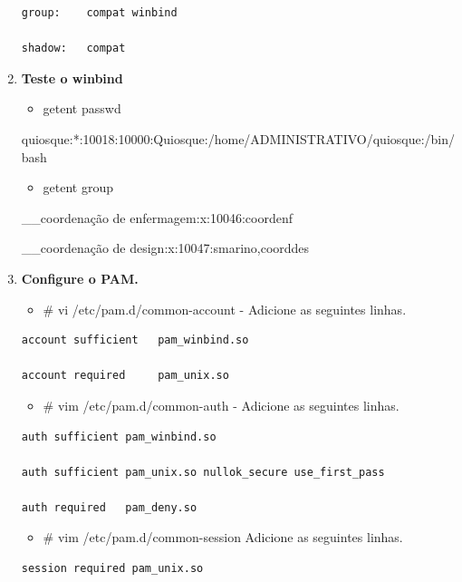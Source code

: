 \begin{enumerate}
\begin{lstlisting}
group:    compat winbind

shadow:   compat
		\end{lstlisting}

 	\item \textbf{Teste o winbind}
		\begin{itemize}
			\item {getent passwd}
		\end{itemize}
		quiosque:*:10018:10000:Quiosque:/home/ADMINISTRATIVO/quiosque:/bin/bash

		\begin{itemize}
			\item {getent group}
		\end{itemize}

		\_\_coordenação de enfermagem:x:10046:coordenf

		\_\_coordenação de design:x:10047:smarino,coorddes

	\item \textbf{Configure o PAM.}
		\begin{itemize}
			\item {\# vi /etc/pam.d/common-account} - Adicione as seguintes linhas.\\
		\end{itemize}

		\begin{lstlisting}
account sufficient   pam_winbind.so

account required     pam_unix.so
		\end{lstlisting}

		\begin{itemize}
			\item {\# vim /etc/pam.d/common-auth} - Adicione as seguintes linhas.\\
		\end{itemize}

		\begin{lstlisting}
auth sufficient pam_winbind.so

auth sufficient pam_unix.so nullok_secure use_first_pass

auth required   pam_deny.so
		\end{lstlisting}

		\begin{itemize}
			\item {\# vim /etc/pam.d/common-session} Adicione as seguintes linhas.\\
		\end{itemize}

		\begin{lstlisting}
session required pam_unix.so


\end{lstlisting}
\end{enumerate}
